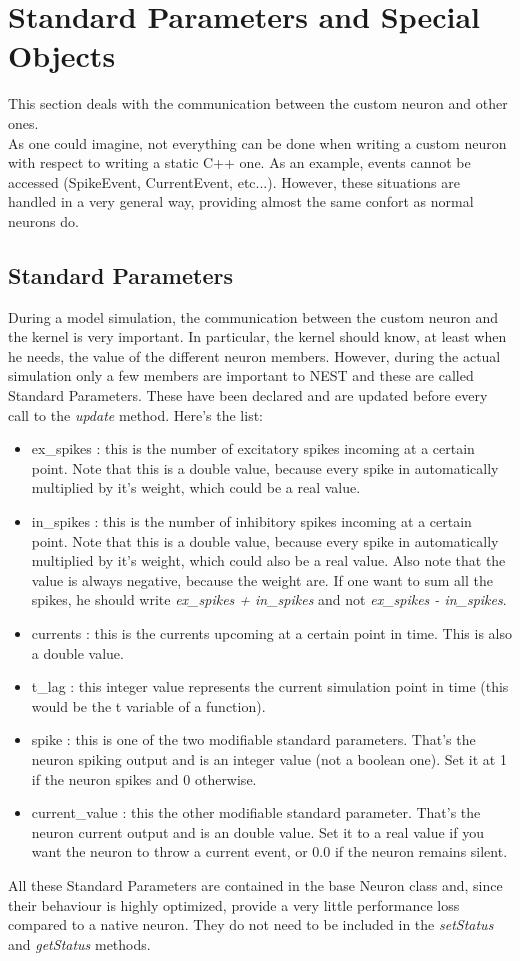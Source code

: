 \documentclass{article}
\begin{document}
\section{Standard Parameters and Special Objects}
This section deals with the communication between the custom neuron and other ones.\\
As one could imagine, not everything can be done when writing a custom neuron with respect to writing a static C++ one. As an example, events cannot be accessed (SpikeEvent, CurrentEvent, etc...). However, these situations are handled in a very general way, providing almost the same confort as normal neurons do.

\subsection{Standard Parameters}
During a model simulation, the communication between the custom neuron and the kernel is very important. In particular, the kernel should know, at least when he needs, the value of the different neuron members. However, during the actual simulation only a few members are important to NEST and these are called Standard Parameters.
These have been declared and are updated before every call to the \emph{update} method. Here's the list:
\begin{itemize}
\item ex\_spikes : this is the number of excitatory spikes incoming at a certain point. Note that this is a double value, because every spike in automatically multiplied by it's weight, which could be a real value.
\item in\_spikes : this is the number of inhibitory spikes incoming at a certain point. Note that this is a double value, because every spike in automatically multiplied by it's weight, which could also be a real value. Also note that the value is always negative, because the weight are. If one want to sum all the spikes, he should write \emph{ex\_spikes + in\_spikes} and not \emph{ex\_spikes - in\_spikes}.
\item currents : this is the currents upcoming at a certain point in time. This is also a double value.
\item t\_lag : this integer value represents the current simulation point in time (this would be the t variable of a function).
\item spike : this is one of the two modifiable standard parameters. That's the neuron spiking output and is an integer value (not a boolean one). Set it at 1 if the neuron spikes and 0 otherwise.
\item current\_value : this the other modifiable standard parameter. That's the neuron current output and is an double value. Set it to a real value if you want the neuron to throw a current event, or 0.0 if the neuron remains silent.
\end{itemize}
All these Standard Parameters are contained in the base Neuron class and, since their behaviour is highly optimized, provide a very little performance loss compared to a native neuron. They do not need to be included in the \emph{setStatus} and \emph{getStatus} methods.
\end{document}
